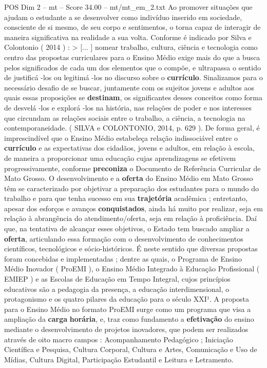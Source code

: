 \begin{textsample}{POS Dim 2 – mt – Score 34.00 – mt/mt\_em\_2.txt}
Ao promover situações que ajudam o estudante a se desenvolver como indivíduo inserido em sociedade, consciente de si mesmo, de seu corpo e sentimentos, o torna capaz de interagir de maneira significativa na realidade a sua volta.
Conforme é indicado por Silva e Colontonio ( 2014 ) : > [... ] nomear trabalho, cultura, ciência e tecnologia como centro das propostas curriculares para o Ensino Médio exige mais do que a busca pelos significados de cada um dos elementos que o compõe, e ultrapassa o sentido de justificá -los ou legitimá -los no discurso sobre o \textbf{currículo}.
Sinalizamos para o necessário desafio de se buscar, juntamente com os sujeitos jovens e adultos aos quais essas proposições se \textbf{destinam}, os significantes desses conceitos como forma de desvelá -los e explorá -los na história, nas relações de poder e nos interesses que circundam as relações sociais entre o trabalho, a ciência, a tecnologia na contemporaneidade. ( SILVA e COLONTONIO, 2014, p. 629 ).
De forma geral, é imprescindível que o Ensino Médio estabeleça relação indissociável entre o \textbf{currículo} e as expectativas dos cidadãos, jovens e adultos, em relação à escola, de maneira a proporcionar uma educação cujas aprendizagens se efetivem progressivamente, conforme \textbf{preconiza} o Documento de Referência Curricular de Mato Grosso.
O desenvolvimento e a \textbf{oferta} do Ensino Médio em Mato Grosso têm se caracterizado por objetivar a preparação dos estudantes para o mundo do trabalho e para que tenha sucesso em sua \textbf{trajetória} acadêmica ; entretanto, apesar dos esforços e avanços \textbf{conquistados}, ainda há muito por realizar, seja em relação à abrangência do atendimento/oferta, seja em relação à proficiência.
Daí que, na tentativa de alcançar esses objetivos, o Estado tem buscado ampliar a \textbf{oferta}, articulando essa formação com o desenvolvimento de conhecimentos científicos, tecnológicos e sócio-históricos.
É neste sentido que diversas propostas foram concebidas e implementadas ; dentre as quais, o Programa de Ensino Médio Inovador ( ProEMI ), o Ensino Médio Integrado à Educação Profissional ( EMIEP ) e as Escolas de Educação em Tempo Integral, cujos princípios educativos são a pedagogia da presença, a educação interdimensional, o protagonismo e os quatro pilares da educação para o século XXI¹.
A proposta para o Ensino Médio no formato ProEMI surge como um programa que visa a ampliação da \textbf{carga} \textbf{horária}, e, traz como fundamento a \textbf{efetivação} do ensino mediante o desenvolvimento de projetos inovadores, que podem ser realizados através de oito macro campos : Acompanhamento Pedagógico ; Iniciação Científica e Pesquisa, Cultura Corporal, Cultura e Artes, Comunicação e Uso de Mídias, Cultura Digital, Participação Estudantil e Leitura e Letramento.

\end{textsample}
